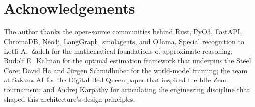 \documentclass[12pt,a4paper]{article}
\begin{document}
\section*{Acknowledgements}

The author thanks the open-source communities behind Rust, PyO3, FastAPI, ChromaDB, Neo4j,
LangGraph, smolagents, and Ollama. Special recognition to Lotfi A.\ Zadeh for the mathematical
foundations of approximate reasoning; Rudolf E.\ Kalman for the optimal estimation framework
that underpins the Steel Core; David Ha and J\"{u}rgen Schmidhuber for the world-model framing;
the team at Sakana AI for the Digital Red Queen paper that inspired the Idle Zero tournament;
and Andrej Karpathy for articulating the engineering discipline that shaped this architecture's
design principles.
\end{document}
